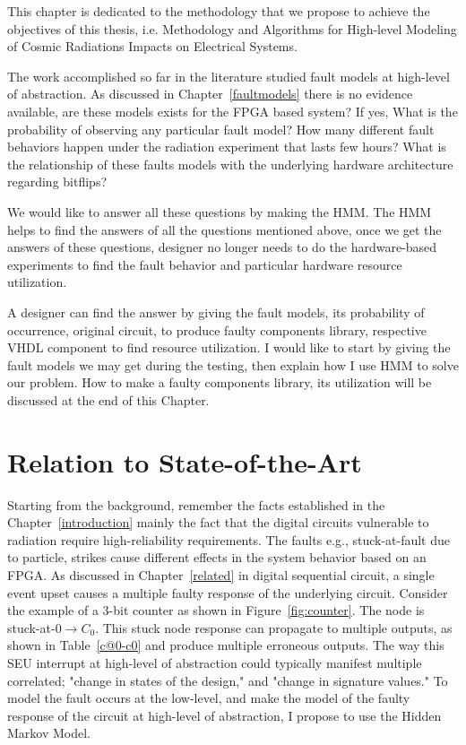 This chapter is dedicated to the methodology that we propose to achieve the objectives of this thesis, i.e. Methodology and Algorithms for High-level Modeling of Cosmic Radiations Impacts on Electrical Systems.



The work accomplished so far in the literature studied fault models at high-level of abstraction. As discussed in Chapter~\ref{faultmodels} there is no evidence available, are these models exists for the FPGA based system? If yes, What is the probability of observing any particular fault model? How many different fault behaviors happen under the radiation experiment that lasts few hours?  What is the relationship of these faults models with the underlying hardware architecture regarding bitflips?

We would like to answer all these questions by making the HMM. The HMM helps to find the answers of all the questions mentioned above, once we get the answers of these questions, designer no longer needs to do the hardware-based experiments to find the fault behavior and particular hardware resource utilization. 

A designer can find the answer by giving the fault models, its probability of occurrence, original circuit, to produce faulty components library, respective VHDL component to find resource utilization. I would like to start by giving the fault models we may get during the testing, then explain how I use HMM to solve our problem. How to make a faulty components library, its utilization will be discussed at the end of this Chapter.
\label{approach}
\section{Relation to State-of-the-Art}
Starting from the background, remember the facts established in the Chapter~\ref{introduction} mainly the fact that the digital circuits vulnerable to radiation require high-reliability requirements. The faults e.g., stuck-at-fault due to particle, strikes cause different effects in the system behavior based on an FPGA. As discussed in Chapter~\ref{related} in digital sequential circuit, a single event upset causes a multiple faulty response of the underlying circuit. Consider the example of  a 3-bit counter as shown in Figure~\ref{fig:counter}. The node is stuck-at-0$\rightarrow C_0$. This stuck node response can propagate to multiple outputs, as shown in Table~\ref{c@0-c0} and produce multiple erroneous outputs. The way this SEU interrupt at high-level of abstraction could typically manifest multiple correlated; "change in states of the design," and "change in signature values." To model the fault occurs at the low-level, and make the model of the faulty response of the circuit at high-level of abstraction, I propose to use the Hidden Markov Model. 




